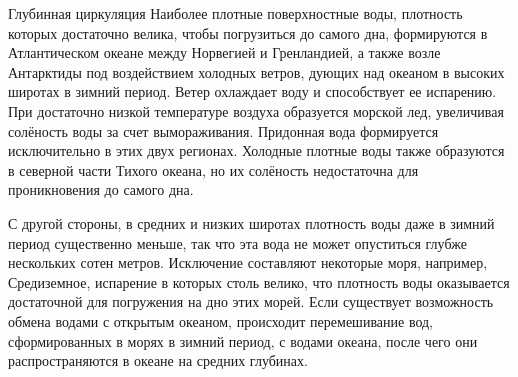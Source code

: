 \begin{chapter}{Глубинная циркуляция}
Наиболее плотные поверхностные воды, плотность которых достаточно велика,
чтобы погрузиться до самого дна, формируются в Атлантическом океане между
Норвегией и Гренландией, а также возле Антарктиды под воздействием холодных 
ветров, дующих над океаном в высоких широтах в зимний период. Ветер охлаждает
воду и способствует ее испарению. При достаточно низкой температуре воздуха
образуется морской лед, увеличивая солёность воды за счет вымораживания.
Придонная вода формируется 
исключительно в этих двух регионах. Холодные плотные воды также образуются 
в северной части Тихого океана, но их солёность недостаточна для проникновения 
до самого дна.
%

С другой стороны, в средних и низких широтах плотность воды даже в зимний
период существенно меньше, так что эта вода не может опуститься глубже
нескольких сотен метров. Исключение составляют некоторые моря, например,
Средиземное, испарение в которых столь велико, что плотность воды оказывается
достаточной для погружения на дно этих морей. Если существует возможность
обмена водами с открытым океаном, происходит перемешивание вод, сформированных
в морях в зимний период, с водами океана, после чего они распространяются
в океане на средних глубинах.
%



\end{chapter}
